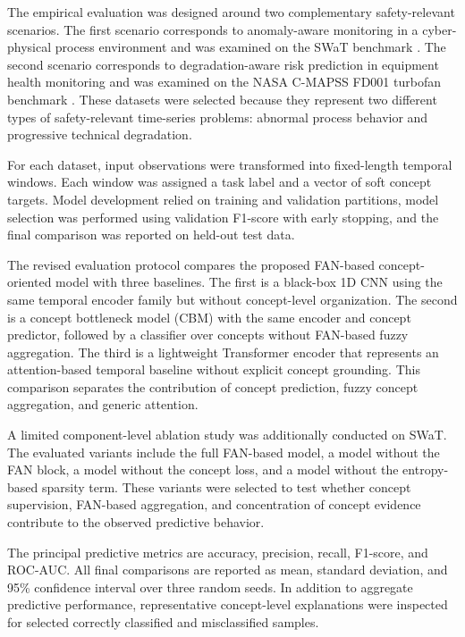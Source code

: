 \documentclass[runningheads]{llncs}
\begin{document}
The empirical evaluation was designed around two complementary safety-relevant scenarios. The first scenario corresponds to anomaly-aware monitoring in a cyber-physical process environment and was examined on the SWaT benchmark \cite{kaggle_swat_dataset}. The second scenario corresponds to degradation-aware risk prediction in equipment health monitoring and was examined on the NASA C-MAPSS FD001 turbofan benchmark \cite{kaggle_nasa_cmaps}. These datasets were selected because they represent two different types of safety-relevant time-series problems: abnormal process behavior and progressive technical degradation.

For each dataset, input observations were transformed into fixed-length temporal windows. Each window was assigned a task label and a vector of soft concept targets. Model development relied on training and validation partitions, model selection was performed using validation F1-score with early stopping, and the final comparison was reported on held-out test data.

The revised evaluation protocol compares the proposed FAN-based concept-oriented model with three baselines. The first is a black-box 1D CNN using the same temporal encoder family but without concept-level organization. The second is a concept bottleneck model (CBM) with the same encoder and concept predictor, followed by a classifier over concepts without FAN-based fuzzy aggregation. The third is a lightweight Transformer encoder that represents an attention-based temporal baseline without explicit concept grounding. This comparison separates the contribution of concept prediction, fuzzy concept aggregation, and generic attention.

A limited component-level ablation study was additionally conducted on SWaT. The evaluated variants include the full FAN-based model, a model without the FAN block, a model without the concept loss, and a model without the entropy-based sparsity term. These variants were selected to test whether concept supervision, FAN-based aggregation, and concentration of concept evidence contribute to the observed predictive behavior.

The principal predictive metrics are accuracy, precision, recall, F1-score, and ROC-AUC. All final comparisons are reported as mean, standard deviation, and 95\% confidence interval over three random seeds. In addition to aggregate predictive performance, representative concept-level explanations were inspected for selected correctly classified and misclassified samples.
\end{document}
